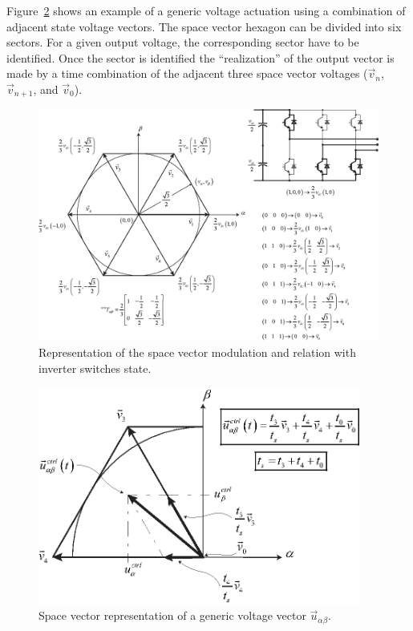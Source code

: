 \documentclass[11pt,a4paper,oneside]{book}
\numberwithin{equation}{section}
\theoremstyle{it}
\theoremstyle{definition}
\begin{document}
Figure~\ref{space_vector_1b} shows an example of a generic voltage actuation using a combination of adjacent state voltage vectors. The space vector hexagon can be divided into six sectors. For a given output voltage, the corresponding sector have to be identified. Once the sector is identified the ``realization'' of the output vector is made by a time combination of the adjacent three space vector voltages ($\vec{v}_n$, $\vec{v}_{n+1}$, and $\vec{v}_0$).
\begin{figure}[H]
	\centering
	\includegraphics[width = 475pt, angle = 0, 
	keepaspectratio]{figures/vector_modulator/space_vector_1.eps}
	\captionsetup{width=0.5\textwidth, font=small}	
	\caption{Representation of the space vector modulation and relation with inverter switches state.}
	\label{space_vector_1}
\end{figure}
\begin{figure}[H]
	\centering
	\includegraphics[width = 300pt, angle = 0, 
	keepaspectratio]{figures/vector_modulator/space_vector_1c.eps}
	\captionsetup{width=0.5\textwidth, font=small}	
	\caption{Space vector representation of a generic voltage vector $\vec{u}_{\alpha\beta}$.}
	\label{space_vector_1b}
\end{figure}
\end{document}
